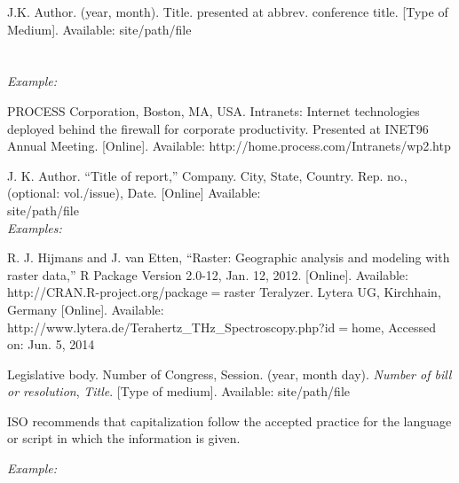 \documentclass[journal,twoside,web]{ieeecolor}
\begin{document}
\noindent J.K. Author. (year, month). Title. presented at abbrev. conference title.
[Type of Medium]. Available: site/path/file
\\
\\
\\
{\it Example:}{\vadjust{\vspace*{-2.5em}}}

\begin{thebibliography}{00}
 PROCESS Corporation, Boston, MA, USA. Intranets: Internet technologies deployed behind the firewall for corporate productivity. Presented at INET96 Annual Meeting. [Online]. Available:  {http://home.process.com/Intranets/wp2.htp}
\end{thebibliography}


\noindent J. K. Author. ``Title of report,'' Company. City, State, Country. Rep. no.,
(optional: vol./issue), Date. [Online] Available:\\
{site/path/file}\\

{\it Examples:}{\vadjust{\vspace*{-2.5em}}}

\begin{thebibliography}{00}
 R. J. Hijmans and J. van Etten, ``Raster: Geographic analysis and modeling with raster data,'' R Package Version 2.0-12, Jan. 12, 2012. [Online]. Available:  {http://CRAN.R-project.org/package$=$raster} {}
 Teralyzer. Lytera UG, Kirchhain, Germany [Online]. Available: http://www.lytera.de/Terahertz\_THz\_Spectroscopy.php?id$=$home, Accessed on: Jun. 5, 2014
\end{thebibliography}


\noindent Legislative body. Number of Congress, Session. (year, month day). {\it Number of bill or resolution}, {\it Title}. [Type
of medium]. Available: site/path/file

 ISO recommends that capitalization follow the accepted
practice for the language or script in which the information is given.



{\it Example:}{\vadjust{\vspace*{-2.5em}}}
\end{document}
